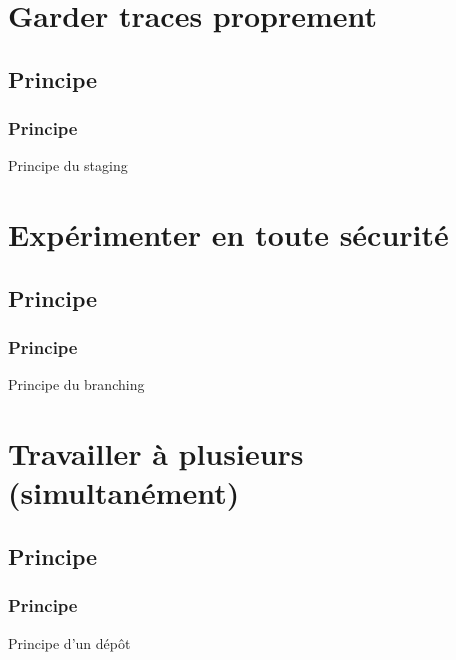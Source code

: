 \documentclass[t,11pt]{beamer}
\begin{document}
\section{Garder traces proprement}
\begin{frame}[c]
\end{frame}

\subsection{Principe}
\begin{frame}
        \frametitle{Principe}
        Principe du staging
\end{frame}

\section{Exp\'erimenter en toute s\'ecurit\'e}
\begin{frame}[c]
\end{frame}

\subsection{Principe}
\begin{frame}
        \frametitle{Principe}
        Principe du branching
\end{frame}

\section{Travailler \`a plusieurs (simultan\'ement) }
\begin{frame}[c]
\end{frame}

\subsection{Principe}
\begin{frame}
        \frametitle{Principe}
        Principe d'un d\'ep\^ot
\end{frame}
\end{document}
